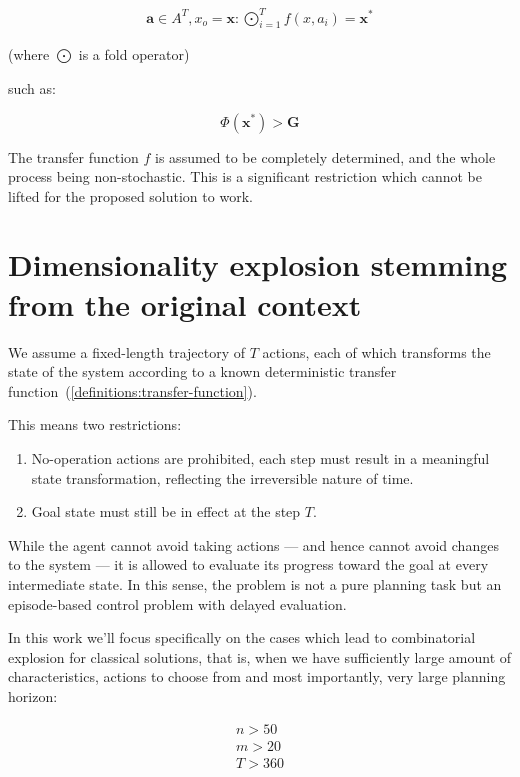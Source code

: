 \documentclass[12pt, a4paper]{report}
\begin{document}
	\begin{eqnarray}\label{definitions:fold}
		\mathbf{a} \in A^T, x_o = \mathbf{x}: \bigodot_{i=1}^{T} f(x, a_i) = \mathbf{x}^*
	\end{eqnarray}
	
	(where $\bigodot$ is a fold operator)
	
	such as:
	
	\begin{equation}
		\Phi(\mathbf{x}^*) > \mathbf{G}
	\end{equation}
	
	The transfer function $f$ is assumed to be completely determined, and the whole process being non-stochastic. This is a significant restriction which cannot be lifted for the proposed solution to work.

	\section{Dimensionality explosion stemming from the original context}

	We assume a fixed-length trajectory of $𝑇$ actions, each of which transforms the state of the system according to a known deterministic transfer function~(\ref{definitions:transfer-function}).

	This means two restrictions:
	
	\begin{enumerate}
		\item No-operation actions are prohibited, each step must result in a meaningful state transformation, reflecting the irreversible nature of time.
		\item Goal state must still be in effect at the step $T$.
	\end{enumerate}

	While the agent cannot avoid taking actions — and hence cannot avoid changes to the system — it is allowed to evaluate its progress toward the goal at every intermediate state.
	In this sense, the problem is not a pure planning task but an episode-based control problem with delayed evaluation.
	
	In this work we'll focus specifically on the cases which lead to combinatorial explosion for classical solutions, that is, when we have sufficiently large amount of characteristics, actions to choose from and most importantly, very large planning horizon:
	
	\begin{eqnarray}
		n > 50 \\
		m > 20 \\
		T > 360
	\end{eqnarray}
	
\end{document}
